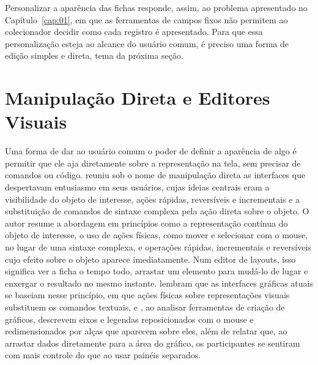 Personalizar a aparência das fichas responde, assim, ao problema apresentado no Capítulo~\ref{cap:01}, em que as ferramentas de campos fixos não permitem ao
colecionador decidir como cada registro é apresentado. Para que essa personalização esteja ao alcance do usuário comum, é preciso uma forma de edição simples e
direta, tema da próxima seção.


\section{Manipulação Direta e Editores Visuais}
\label{sec:manipulacao-direta}

Uma forma de dar ao usuário comum o poder de definir a aparência de algo é permitir que ele aja diretamente sobre a representação na tela, sem precisar de
comandos ou código.  reuniu sob o nome de manipulação direta as interfaces que despertavam entusiasmo em seus usuários, cujas
ideias centrais eram a visibilidade do objeto de interesse, ações rápidas, reversíveis e incrementais e a substituição de comandos de sintaxe complexa pela ação
direta sobre o objeto. O autor resume a abordagem em princípios como a representação contínua do objeto de interesse, o uso de ações físicas, como mover e
selecionar com o mouse, no lugar de uma sintaxe complexa, e operações rápidas, incrementais e reversíveis cujo efeito sobre o objeto aparece imediatamente.
Num editor de layouts, isso significa ver a ficha o tempo todo, arrastar um elemento para mudá-lo de lugar e enxergar o resultado
no mesmo instante.  lembram que as interfaces gráficas atuais se baseiam nesse princípio, em que ações físicas sobre
representações visuais substituem os comandos textuais, e , ao analisar ferramentas de criação de gráficos, descrevem eixos e
legendas reposicionados com o mouse e redimensionados por alças que aparecem sobre eles, além de relatar que, ao arrastar dados diretamente para a área do
gráfico, os participantes se sentiram com mais controle do que ao usar painéis separados.


